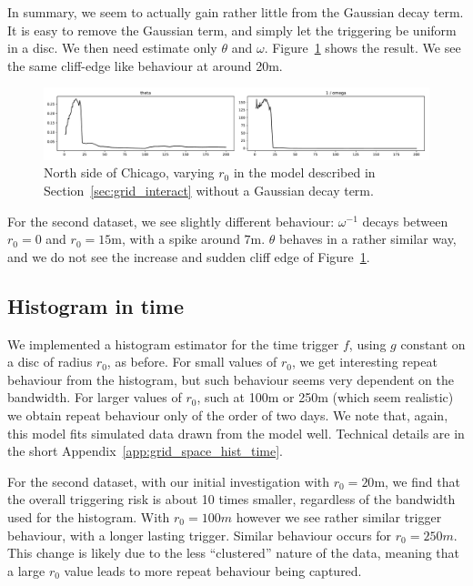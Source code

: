 \documentclass[twoside,a4paper]{article}
\theoremstyle{plain}
\theoremstyle{definition}
\begin{document}
In summary, we seem to actually gain rather little from the Gaussian decay term.  It is easy
to remove the Gaussian term, and simply let the triggering be uniform in a disc.  We then need
estimate only $\theta$ and $\omega$.  Figure~\ref{fig:grid_vary_r01} shows the result.  We see
the same cliff-edge like behaviour at around 20m.

\begin{figure}
  \includegraphics[width=\textwidth]{../notebooks/varying_r0_no_g.pdf}
  \caption{North side of Chicago, varying $r_0$ in the model described in Section~\ref{sec:grid_interact} without a Gaussian decay term.}
  \label{fig:grid_vary_r01}
\end{figure}

For the second dataset, we see slightly different behaviour: $\omega^{-1}$ decays between
$r_0=0$ and $r_0=15$m, with a spike around $7$m.  $\theta$ behaves in a rather similar way,
and we do not see the increase and sudden cliff edge of Figure~\ref{fig:grid_vary_r01}.



\subsection{Histogram in time}

We implemented a histogram estimator for the time trigger $f$, using $g$ constant on a disc
of radius $r_0$, as before.  For small values of $r_0$, we get interesting repeat behaviour
from the histogram, but such behaviour seems very dependent on the bandwidth.  For larger
values of $r_0$, such at 100m or 250m (which seem realistic) we obtain repeat behaviour only
of the order of two days.  We note that, again, this model fits simulated data drawn from
the model well.  Technical details are in the short Appendix~\ref{app:grid_space_hist_time}.

For the second dataset, with our initial investigation with $r_0=20$m, we find that the overall
triggering risk is about 10 times smaller, regardless of the bandwidth used for the
histogram.  With $r_0=100m$ however we see rather similar trigger behaviour, with a longer
lasting trigger.  Similar behaviour occurs for $r_0=250m$.  This change is likely due to
the less ``clustered'' nature of the data, meaning that a large $r_0$ value leads to more
repeat behaviour being captured.
\end{document}
